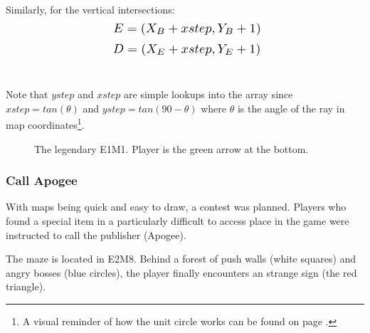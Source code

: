 \par
Similarly, for the vertical intersections:\\
  \begin{equation*}
    \scalebox{1.3}{

$E = (X_{B} + xstep, Y_{B} + 1)$\\
}
\end{equation*}
  \begin{equation*}
    \scalebox{1.3}{
$D = (X_{E} + xstep, Y_{E} + 1)$\\
}
\end{equation*}\\
\par
Note that $ystep$ and $xstep$ are simple lookups into the  array since $xstep=tan(\theta)$ and $ystep=tan(90-\theta)$ where $\theta$ is the angle of the ray in map coordinates\footnote{A visual reminder of how the unit circle works can be found on page \pageref{unit_circle}.}.\\
\par
\begin{figure}[H]
  \centering
 \label{mape1m1}
 \caption{The legendary E1M1. Player is the green arrow at the bottom.}
\end{figure}


\subsubsection{Call Apogee}
With maps being quick and easy to draw, a contest was planned. Players who found a special item in a particularly difficult to access place in the game were instructed to call the publisher (Apogee).\\
\par The maze is located in E2M8. Behind a forest of push walls (white squares) and angry bosses (blue circles), the player finally encounters an strange sign (the red triangle).


